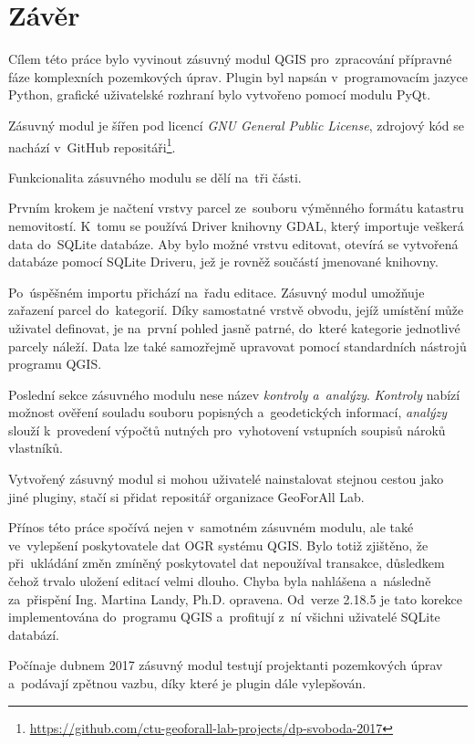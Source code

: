 \chapter{Závěr}
\label{zaver}

Cílem této práce bylo vyvinout zásuvný modul QGIS pro~zpracování přípravné fáze komplexních pozemkových úprav. Plugin byl napsán v~programovacím jazyce Python, grafické uživatelské rozhraní bylo vytvořeno pomocí modulu PyQt.

Zásuvný modul je šířen pod licencí \textit{GNU General Public License}, zdrojový kód se nachází v~GitHub repositáři\footnote{\url{https://github.com/ctu-geoforall-lab-projects/dp-svoboda-2017}}.

Funkcionalita zásuvného modulu se dělí na~tři části.

Prvním krokem je načtení vrstvy parcel ze~souboru výměnného formátu katastru nemovitostí. K~tomu se používá  Driver knihovny GDAL, který importuje veš\-kerá data do~SQLite databáze. Aby bylo možné vrstvu editovat, otevírá se vytvořená databáze pomocí SQLite Driveru, jež je rovněž součástí jmenované knihovny.

Po~úspěšném importu přichází na~řadu editace. Zásuvný modul umožňuje zařazení parcel do~kategorií. Díky samostatné vrstvě obvodu, jejíž umístění může uživatel definovat, je na~první pohled jasně patrné, do~které kategorie jednotlivé parcely náleží. Data lze také samozřejmě upravovat pomocí standardních nástrojů programu QGIS.

Poslední sekce zásuvného modulu nese název \textit{kontroly a~analýzy}. \textit{Kontroly} nabízí možnost ověření souladu souboru popisných a~geodetických informací, \textit{analýzy} slouží k~provedení výpočtů nutných pro~vyhotovení vstupních soupisů nároků vlastníků.

Vytvořený zásuvný modul si mohou uživatelé nainstalovat stejnou cestou jako jiné pluginy, stačí si přidat repositář organizace GeoForAll Lab.

Přínos této práce spočívá nejen v~samotném zásuvném modulu, ale také ve~vylep\-šení poskytovatele dat OGR systému QGIS. Bylo totiž zjištěno, že při~ukládání změn zmíněný poskytovatel dat nepoužíval transakce, důsledkem čehož trvalo uložení editací velmi dlouho. Chyba byla nahlášena a~následně za~přispění Ing. Martina Landy, Ph.D. opravena. Od~verze 2.18.5 je tato korekce implementována do~programu QGIS a~profitují z~ní všichni uživatelé SQLite databází.

Počínaje dubnem 2017 zásuvný modul testují projektanti pozemkových úprav a~podávají zpětnou vazbu, díky které je plugin dále vylepšován.

